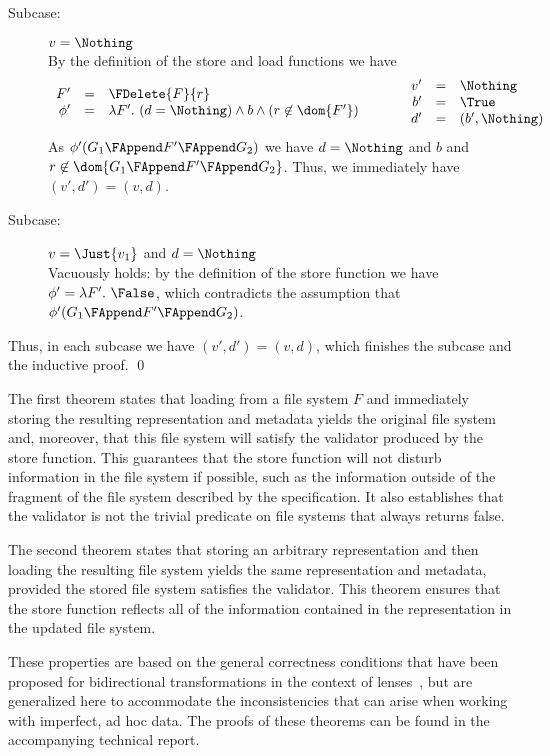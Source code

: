 {\begin{description}
\begin{description}
\item[Subcase:] $v = \Nothing$\\[1ex]
%
By the definition of the store and load functions we have
\[
\begin{array}{rcl}
F' &=& \FDelete{F}{r}\\
\phi' &=& \lambda F'.~(d = \Nothing) \wedge b \wedge (r \not\in \dom{F'})\\
\end{array}\hspace*{1cm}\begin{array}{rcl}
v' &=& \Nothing\\
b' &=& \True\\
d' &=& (b',\Nothing)\\
\end{array}
\]
As $\phi'(G_1 \FAppend F' \FAppend G_2)$ we have $d
= \Nothing$ and $b$ and $r \not\in \dom{G_1 \FAppend F' \FAppend
  G_2}$. Thus, we immediately have $(v',d') = (v,d)$. 
\item[Subcase:] $v = \Just{v_1}$ and $d = \Nothing$\\[1ex]
%
Vacuously holds: by the definition of the store function we have
$\phi' = \lambda F'.~\False$, which contradicts the assumption that
$\phi'(G_1 \FAppend F' \FAppend G_2)$.
\end{description}
Thus, in each subcase we have $(v',d') = (v,d)$, which finishes the
subcase and the inductive proof. \hfill \qed
\end{description}}

\smallskip

\noindent The first theorem states that loading from a file system $F$
and immediately storing the resulting representation and metadata
yields the original file system and, moreover, that this file system
will satisfy the validator produced by the store function. This
guarantees that the store function will not disturb information in the
file system if possible, such as the information outside of the
fragment of the file system described by the specification. It also
establishes that the validator is not the trivial predicate on file
systems that always returns false.

The second theorem states that storing an arbitrary representation and
then loading the resulting file system yields the same representation
and metadata, provided the stored file system satisfies the validator.
This theorem ensures that the store function reflects all of the
information contained in the representation in the updated file
system.

These properties are based on the general correctness conditions that
have been proposed for bidirectional transformations in the context of
lenses~\cite{lenses}, but are generalized here to accommodate the
inconsistencies that can arise when working with imperfect, ad hoc
data. The proofs of these theorems can be found in the accompanying
technical report.

